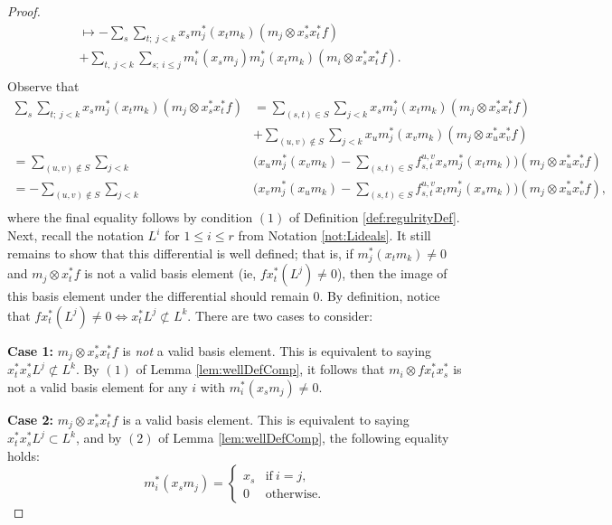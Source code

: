 \documentclass[10pt]{amsart}
\theoremstyle{definition}
\theoremstyle{remark}
\newtheorem{the context}[theorem]{The Context}
\numberwithin{equation}{theorem}
\numberwithin{equation}{section}
\renewcommand{\leq}{\leqslant}
\begin{document}
\begin{proof}
\begin{align*}
    &\mapsto -\sum_{s} \sum_{t; \ j<k} x_s m_j^* (x_t m_k ) (m_j \otimes  x_s^* x_t^* f) \\
    &+ \sum_{t, \ j<k}\sum_{s ; \ i \leq j} m_i^* (x_s m_j) m_j^* (x_t m_k ) (m_i \otimes x_s^* x_t^* f). \\
\end{align*}
\endgroup
Observe that
\begingroup\allowdisplaybreaks
\begin{align*}
    \sum_{s} \sum_{t; \ j<k} x_s m_j^* (x_t m_k ) (m_j \otimes  x_s^* x_t^* f) &= \sum_{(s,t) \in S} \sum_{j < k} x_s m_j^* (x_t m_k ) (m_j \otimes  x_s^* x_t^* f) \\
    &+ \sum_{(u,v) \notin S} \sum_{j<k} x_u m_j^* (x_v m_k ) (m_j \otimes  x_u^* x_v^* f) \\
    =  \sum_{(u,v) \notin S} \sum_{j<k}& \Big( x_u m_j^* (x_v m_k ) - \sum_{(s,t) \in S} f^{u,v}_{s,t} x_s m_j^*(x_t m_k) \Big) (m_j \otimes  x_u^* x_v^* f) \\
    = -\sum_{(u,v) \notin S} \sum_{j<k}& \Big( x_v m_j^* (x_u m_k ) - \sum_{(s,t) \in S} f^{u,v}_{s,t} x_t m_j^*(x_s m_k) \Big) (m_j \otimes  x_u^* x_v^* f), \\
\end{align*}
\endgroup
where the final equality follows by condition $(1)$ of Definition \ref{def:regulrityDef}. Next, recall the notation $L^i$ for $1 \leq i \leq r$ from Notation \ref{not:Lideals}. It still remains to show that this differential is well defined; that is, if $m_j^* (x_t m_k) \neq 0$ and $m_j \otimes x_t^*f$ is not a valid basis element (ie, $fx_t^* (L^j) \neq 0$), then the image of this basis element under the differential should remain $0$. By definition, notice that $f x_t^* (L^j) \neq 0 \iff x_t^* L^j \not\subset L^k$. There are two cases to consider:

\textbf{Case 1:} $m_j \otimes x_s^* x_t^* f$ is \emph{not} a valid basis element. This is equivalent to saying $x_t^* x_s^* L^j \not\subset L^k$. By $(1)$ of Lemma \ref{lem:wellDefComp}, it follows that $m_i \otimes f x_t^* x_s^*$ is not a valid basis element for any $i$ with $m_i^* (x_s m_j) \neq 0$.

\textbf{Case 2:} $m_j \otimes x_s^* x_t^* f$ is a valid basis element. This is equivalent to saying $x_t^* x_s^* L^j \subset L^k$, and by $(2)$ of Lemma \ref{lem:wellDefComp}, the following equality holds: 
$$m_i^* (x_s m_j) = \begin{cases} 
x_s & \textrm{if} \ i=j, \\
0 & \textrm{otherwise}.
\end{cases}$$


\end{proof}
\end{document}
